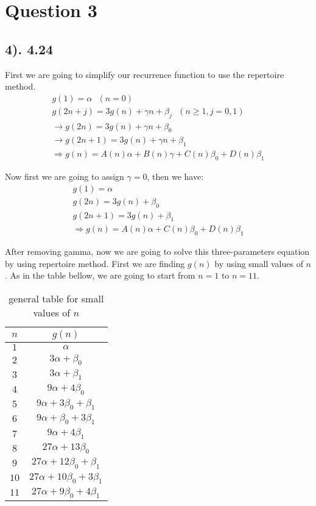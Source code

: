 \documentclass[12pt]{article}
\begin{document}
\section*{Question 3}
\subsection*{4). 4.24}
First we are going to simplify our recurrence function to use the repertoire method.
\begin{gather*}
    g(1) = \alpha \text{ $(n=0)$} \\
    g(2n+j) = 3g(n) + \gamma n + \beta_{j} \text{ $(n \geq 1, j=0,1)$} \\
    \to g(2n) = 3g(n) + \gamma n + \beta_{0} \\
    \to g(2n+1) = 3g(n) + \gamma n + \beta_{1} \\
    \Rightarrow g(n) = A(n) \alpha + B(n) \gamma + C(n) \beta_{0} + D(n) \beta_{1}
\end{gather*}

Now first we are going to assign $\gamma = 0$, then we have:
\begin{gather*}
    g(1) = \alpha \\
    g(2n) = 3g(n) + \beta_{0} \\
    g(2n+1) = 3g(n) + \beta_{1} \\
    \Rightarrow g(n) = A(n) \alpha + C(n) \beta_{0} + D(n) \beta_{1}
\end{gather*}

After removing gamma, now we are going to solve this three-parameters equation by using repertoire method.
First we are finding $g(n)$ by using small values of $n$. As in the table bellow, we are going to start
from $n=1$ to $n=11$.
\begin{table}[H]
    \centering
    \begin{tabular}{c|c}
        $n$ & $g(n)$ \\
        \hline
        $1$ & $\alpha$ \\
        \hline
        $2$ & $3\alpha + \beta_{0}$ \\
        $3$ & $3\alpha + \beta_{1}$ \\
        \hline
        $4$ & $9\alpha + 4\beta_{0}$ \\
        $5$ & $9\alpha + 3\beta_{0} + \beta_{1}$ \\
        $6$ & $9\alpha + \beta_{0} + 3\beta_{1}$ \\
        $7$ & $9\alpha + 4\beta_{1}$ \\
        \hline
        $8$ & $27\alpha + 13\beta_{0}$ \\
        $9$ & $27\alpha + 12\beta_{0} + \beta_{1}$ \\
        $10$ & $27\alpha + 10\beta_{0} + 3\beta_{1}$ \\
        $11$ & $27\alpha + 9\beta_{0} + 4\beta_{1}$
    \end{tabular}
    \caption{general table for small values of $n$}
    \label{tab:sample}
\end{table}
\end{document}
